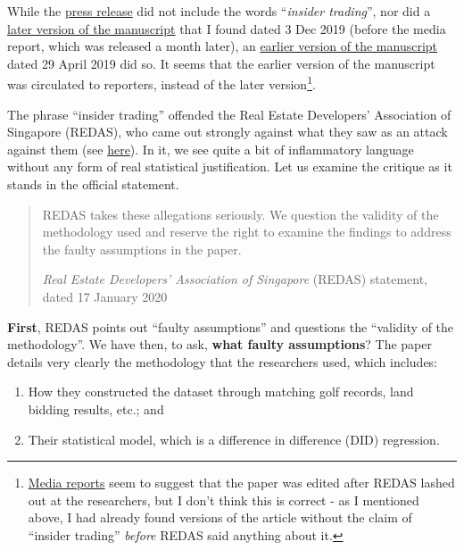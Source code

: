 \documentclass[openany]{book}
\providecommand{\tightlist}{%
  \setlength{\itemsep}{0pt}\setlength{\parskip}{0pt}}
\let\rmarkdownfootnote\footnote%
\def\footnote{\protect\rmarkdownfootnote}
\begin{document}
While the
\href{https://bschool.nus.edu.sg/media/press-release-details/636/}{press
release} did not include the words ``\emph{insider trading}'', nor did a
\href{https://www.arx.cfa/-/media/regional/arx/post-pdf/2019/12/24/afbc-2019-golfing-for-information.ashx}{later
version of the manuscript} that I found dated 3 Dec 2019 (before the
media report, which was released a month later), an
\href{https://editorialexpress.com/cgi-bin/conference/download.cgi?db_name=AFAPS2020\&paper_id=234}{earlier
version of the manuscript} dated 29 April 2019 did so. It seems that the
earlier version of the manuscript was circulated to reporters, instead
of the later version\footnote{\href{https://www.todayonline.com/singapore/nus-researchers-drop-claim-insider-trading-among-real-estate-executives-golf-course}{Media
  reports} seem to suggest that the paper was edited after REDAS lashed
  out at the researchers, but I don't think this is correct - as I
  mentioned above, I had already found versions of the article without
  the claim of ``insider trading'' \emph{before} REDAS said anything
  about it.}.

The phrase ``insider trading'' offended the Real Estate Developers'
Association of Singapore (REDAS), who came out strongly against what
they saw as an attack against them (see
\href{https://www.redas.com/assets/files/press\%20release/2019/REDAS_Response_NUS_Study_on_Link.pdf}{here}).
In it, we see quite a bit of inflammatory language without any form of
real statistical justification. Let us examine the critique as it stands
in the official statement.

\begin{quote}
REDAS takes these allegations seriously. We question the validity of the
methodology used and reserve the right to examine the findings to
address the faulty assumptions in the paper.

\emph{Real Estate Developers' Association of Singapore} (REDAS)
statement, dated 17 January 2020
\end{quote}

\textbf{First}, REDAS points out ``faulty assumptions'' and questions
the ``validity of the methodology''. We have then, to ask, \textbf{what
faulty assumptions}? The paper details very clearly the methodology that
the researchers used, which includes:

\begin{enumerate}
\def\labelenumi{\arabic{enumi}.}
\tightlist
\item
  How they constructed the dataset through matching golf records, land
  bidding results, etc.; and
\item
  Their statistical model, which is a difference in difference (DID)
  regression.
\end{enumerate}
\end{document}
